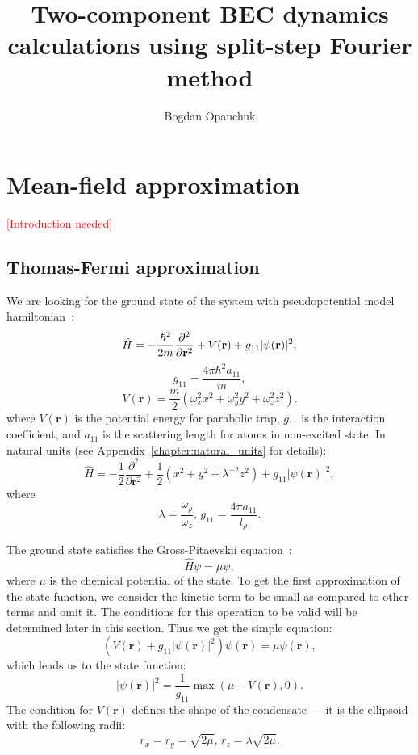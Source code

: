 \documentclass[12pt,notitlepage]{report}
\title{Two-component BEC dynamics calculations using split-step Fourier method}
\author{Bogdan Opanchuk}
\begin{document}
\maketitle

\chapter{Mean-field approximation}

\textcolor{red}{[Introduction needed]}

\section{Thomas-Fermi approximation}

We are looking for the ground state of the system with pseudopotential model hamiltonian~\cite{pitaevskii_bec}:
\[ 
\hat{H} = -\frac{\hbar^2}{2m} \frac{\partial^2}{\partial \mathbf{r}^2} + \\
V(\mathbf{r}) + g_{11} \lvert \psi(\mathbf{r}) \rvert^2,
\]
\[ g_{11} = \frac{4 \pi \hbar^2 a_{11}}{m}, \]
\begin{equation}
\label{thomas-fermi:trap_potential}
V(\mathbf{r}) = \frac{m}{2} \left( \omega_x^2 x^2 + \omega_y^2 y^2 + \omega_z^2 z^2 \right).
\end{equation}
where $V(\mathbf{r})$ is the potential energy for parabolic trap, $g_{11}$ is the interaction coefficient,
and $a_{11}$ is the scattering length for atoms in non-excited state. In natural units
(see Appendix~\ref{chapter:natural_units} for details):
\[
\hat{H} = -\frac{1}{2} \frac{\partial^2}{\partial \mathbf{r}^2} + 
\frac{1}{2} \left( x^2 + y^2 + \lambda^{-2} z^2 \right) + g_{11} \lvert \psi(\mathbf{r}) \rvert^2,
\]
where
\[ \lambda = \frac{\omega_\rho}{\omega_z},\, g_{11} = \frac{4 \pi a_{11}}{l_\rho}. \]

The ground state satisfies the Gross-Pitaevskii equation~\cite{pitaevskii_bec}:
\begin{equation}
\label{thomas-fermi:exact_eqn}
\hat{H} \psi = \mu \psi,
\end{equation}
where $\mu$ is the chemical potential of the state.
To get the first approximation of the state function, we consider the kinetic term to be small as compared to other terms and omit it.
The conditions for this operation to be valid will be determined later in this section.
Thus we get the simple equation:
\[ \left( V(\mathbf{r}) + g_{11} \lvert \psi(\mathbf{r}) \rvert^2 \right) \psi(\mathbf{r}) = \mu \psi(\mathbf{r}), \]
which leads us to the state function:
\begin{equation}
\label{thomas-fermi:wave_function}
\lvert \psi(\mathbf{r}) \rvert^2 = \frac{1}{g_{11}} \max \left( \mu - V(\mathbf{r}), 0 \right).
\end{equation}
The condition for $V(\mathbf{r})$ defines the shape of the condensate --- it is the ellipsoid with the following radii:
\begin{equation}
\label{thomas-fermi:condensate_size}
r_x = r_y = \sqrt{2\mu},\, r_z = \lambda \sqrt{2\mu}.
\end{equation}
\end{document}
